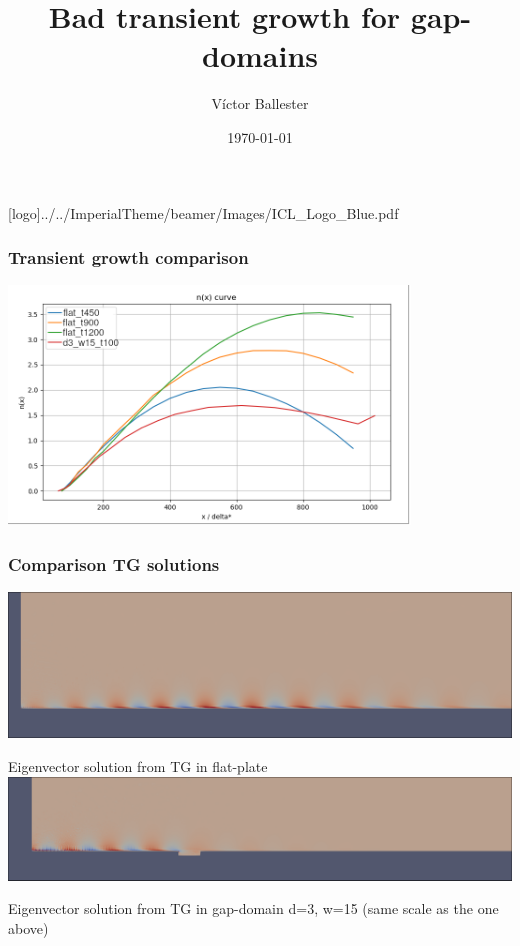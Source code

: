 \documentclass[
  aspectratio=169, %
  t, %
  onlytextwidth, %
  10pt, %
]{beamer}
\title{Bad transient growth for gap-domains} %
\subtitle{} %
\author{Víctor Ballester} %
\date{\today} %
\def\imagefolder{../../ImperialTheme/beamer/Images}
\begin{document}
\begingroup
{} %
[logo]{\imagefolder/ICL_Logo_Blue.pdf} %
\frame[plain, s]{\titlepage} %
\endgroup

\begin{frame}
	\frametitle{Transient growth comparison}
	\centering
	\includegraphics[width=0.8\textwidth]{Images/tgcomparison.png}

\end{frame}
\begin{frame}
	\frametitle{Comparison TG solutions}
	\centering
	\centering
	\includegraphics[width=0.7\linewidth]{Images/tg_flat.png}

	Eigenvector solution from TG in flat-plate
	\includegraphics[width=0.7\linewidth]{Images/tg_d3_w15.png}

	Eigenvector solution from TG in gap-domain d=3, w=15 (same scale as the one above)
\end{frame}
\end{document}

